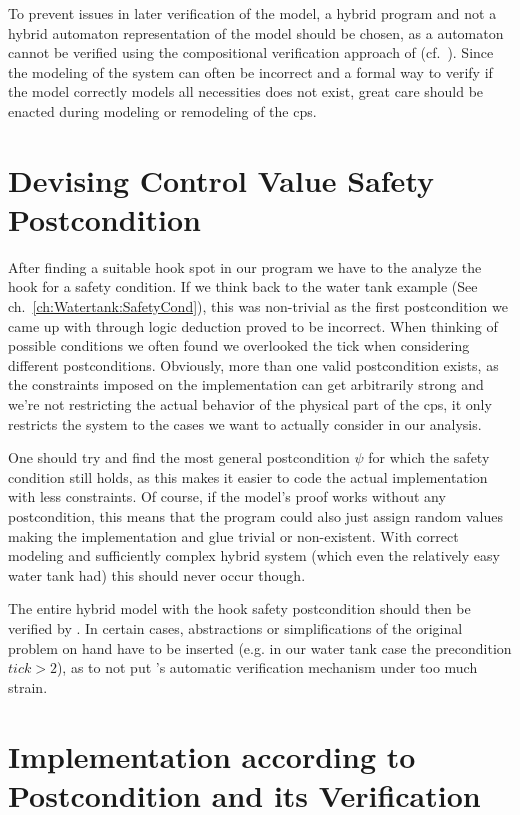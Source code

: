 To prevent issues in later verification of the model, a hybrid program and not a hybrid automaton representation of the model should be chosen, as a automaton cannot be verified using the compositional verification approach of \keym(cf.~\cite[ch.~1.1.4]{platzer2010b}). Since the modeling of the system can often be incorrect and a formal way to verify if the model correctly models all necessities does not exist, great care should be enacted during modeling or remodeling of the cps.

\section{Devising Control Value Safety Postcondition}
\label{sec:Process:SafetyCond}

After finding a suitable hook spot in our program we have to the analyze the hook for a safety condition. If we think back to the water tank example (See ch.~\ref{ch:Watertank:SafetyCond}), this was non-trivial as the first postcondition we came up with through logic deduction proved to be incorrect. When thinking of possible conditions we often found we overlooked the tick when considering different postconditions. Obviously, more than one valid postcondition exists, as the constraints imposed on the implementation can get arbitrarily strong and we're not restricting the actual behavior of the physical part of the cps, it only restricts the system to the cases we want to actually consider in our analysis. 

One should try and find the most general postcondition \(\psi\) for which the safety condition still holds, as this makes it easier to code the actual implementation with less constraints. Of course, if the model's proof works without any postcondition, this means that the program could also just assign random values making the implementation and glue trivial or non-existent. With correct modeling and sufficiently complex hybrid system (which even the relatively easy water tank had) this should never occur though.

The entire hybrid model with the hook safety postcondition should then be verified by \keym. In certain cases, abstractions or simplifications of the original problem on hand have to be inserted (e.g. in our water tank case the precondition \(tick>2\)), as to not put \keym's automatic verification mechanism under too much strain.

\section{Implementation according to Postcondition and its Verification}
\label{sec:Process:Implementation}

